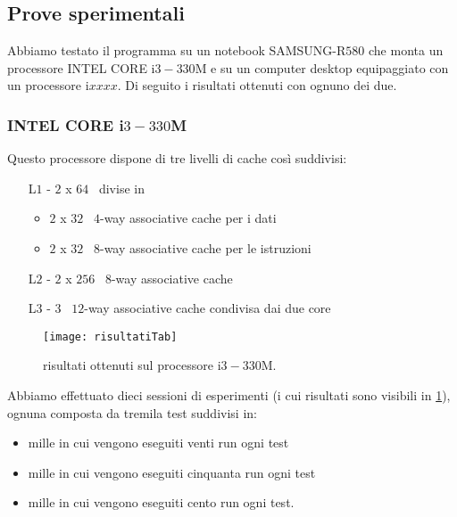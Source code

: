 			\subsection{Prove sperimentali}
				Abbiamo testato il programma su un notebook SAMSUNG-R$580$ che monta un processore INTEL CORE i$3-330$M e su un computer desktop equipaggiato con un processore i$xxxx$. Di seguito i risultati ottenuti con ognuno dei due.
				
				\subsubsection*{INTEL CORE i$3-330$M} 
				
					Questo processore dispone di tre livelli di cache così suddivisi: 
					
					\begin{itemize}
						\item [L$1$ -] $2$ x $64$ \kilobyte \ divise in 
						\begin{itemize}
							\item  $2$ x $32$ \kilobyte \ $4$-way associative cache per i dati
							\item  $2$ x $32$ \kilobyte \ $8$-way associative cache per le istruzioni
						\end{itemize}
						\item[L$2$ -] $2$ x $256$ \kilobyte \ $8$-way associative cache
						\item[L$3$ -] $3$ \megabyte \ $12$-way associative cache condivisa dai due core
					\end{itemize}
				
					\begin{figure}
						\begin{center}
							\texttt{[image: risultatiTab]}
							\caption{risultati ottenuti sul processore i$3-330$M.}
							\label{fig:risultati}
						\end{center}
					\end{figure}
				
					Abbiamo effettuato dieci sessioni di esperimenti (i cui risultati sono visibili in \cref{fig:risultati}), ognuna composta da tremila test suddivisi in:
					\begin{itemize}
						\item mille in cui vengono eseguiti venti run ogni test
						\item mille in cui vengono eseguiti cinquanta run ogni test
						\item mille in cui vengono eseguiti cento run ogni test.
					\end{itemize}
					
